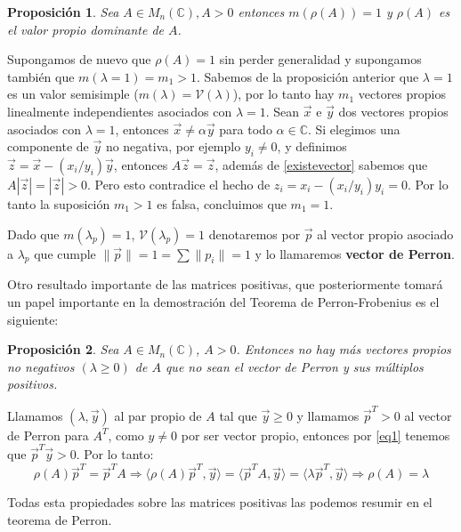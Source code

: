 \documentclass[size=a4, parskip=half, titlepage=false, toc=flat, toc=bib, 12pt]{scrartcl}
\makeatletter
\renewenvironment{proof}[1][\proofname] {\par\pushQED{\qed}\normalfont\topsep6\p@\@plus6\p@\relax\trivlist\item[\hskip\labelsep\itshape\tgpaella#1\@addpunct{.}]\ignorespaces}{\popQED\endtrivlist\@endpefalse}
\theoremstyle{theorem-style}
\newtheorem{nprop}{Proposición}[section]
\theoremstyle{definition-style}
\theoremstyle{remark-style}
\theoremstyle{example-style}
\theoremstyle{definition-style}
\theoremstyle{remark-style}
\makeatother
\begin{document}
\begin{nprop}
Sea $A \in M_n(\mathbb{C}), A > 0$ entonces $m(\rho(A))=1$ y $\rho(A)$ es el valor propio dominante de $A$.
\end{nprop}
\begin{proof}
Supongamos de nuevo que $\rho(A) = 1$ sin perder generalidad y supongamos también que $m(\lambda = 1) = m_1 > 1$. Sabemos de la proposición anterior que $\lambda = 1$ es un valor semisimple ($m(\lambda) = \mathcal{V}(\lambda)$), por lo tanto hay $m_1$ vectores propios linealmente independientes asociados con $\lambda = 1$. Sean $\vec{x}$ e $\vec{y}$ dos vectores propios asociados con $\lambda = 1$, entonces $\vec{x} \neq \alpha \vec{y}$ para todo $\alpha \in \mathbb{C}$. Si elegimos una componente de $\vec{y}$ no negativa, por ejemplo $y_i \neq 0$, y definimos $\vec{z} = \vec{x} - (x_i/y_i)\vec{y}$, entonces $A\vec{z} = \vec{z}$, además de \ref{existevector} sabemos que $A |\vec{z}| = |\vec{z}| >0$. Pero esto contradice el hecho de $z_i = x_i - (x_i/y_i)y_i = 0$. Por lo tanto la suposición $m_1 > 1$ es falsa, concluimos que $m_1 = 1$.
\end{proof}

Dado que $m(\lambda_p) = 1$, $\mathcal{V}(\lambda_p) = 1$ denotaremos por $\vec{p}$ al vector propio asociado a $\lambda_p$ que cumple $\|\vec{p}\| = 1 = \sum \|p_i\| = 1$ y lo llamaremos \textbf{vector de Perron}.

Otro resultado importante de las matrices positivas, que posteriormente tomará un papel importante en la demostración del Teorema de Perron-Frobenius es el siguiente:

\begin{nprop}
\label{nomasvalores}
Sea $A \in M_n(\mathbb{C})$, $A> 0$. Entonces no hay más vectores propios no negativos $(\lambda \geq 0)$ de $A$ que no sean el vector de Perron y sus múltiplos positivos.
\end{nprop}
\begin{proof}
Llamamos $(\lambda, \vec{y})$ al par propio de $A$ tal que $\vec{y} \geq 0$ y llamamos $\vec{p}^T > 0$ al vector de Perron para $A^T$, como $y \neq 0$ por ser vector propio, entonces por \ref{eq1} tenemos que $\vec{p}^T \vec{y} > 0$. Por lo tanto:
$$\rho(A)\vec{p}^T = \vec{p}^T A \Rightarrow \langle \rho(A)\vec{p}^T, \vec{y} \rangle = \langle \vec{p}^TA, \vec{y} \rangle = \langle \lambda \vec{p}^T, \vec{y}\rangle \Rightarrow \rho(A) = \lambda $$
\end{proof}

Todas esta propiedades sobre las matrices positivas las podemos resumir en el teorema de Perron.
\end{document}
